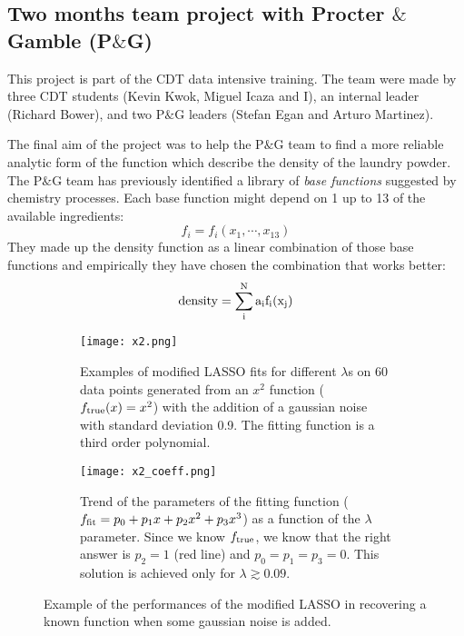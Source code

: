 \documentclass[11pt]{article}
\newcommand{\peg}{P$\&$G }
\begin{document}
\subsection{Two months team project with Procter $\&$ Gamble (P$\&$G)}
\label{sub:peg}

This project is part of the CDT data intensive training. The team were made by three CDT students (Kevin Kwok, Miguel Icaza and I), an internal leader (Richard Bower), and two \peg leaders (Stefan Egan and Arturo Martinez).

The final aim of the project was to help the P$\&$G team to find a more reliable analytic form of the function which describe the density of the laundry powder. The \peg team has previously identified a library of \textit{base functions} suggested by chemistry processes. Each base function might depend on 1 up to 13 of the available ingredients: 
\begin{equation}
\label{eq:fi}
f_i = f_i(x_1, \cdots, x_{13})
\end{equation}
They made up the density function as a linear combination of those base functions and empirically they have chosen the combination that works better: 
\begin{equation}
\label{eq:density}
\rm{density} = \sum_i^N a_i f_i(x_j)
\end{equation}


%
\begin{figure}
\centering
\begin{subfigure}{.48\textwidth}
   \centering
   \texttt{[image: x2.png]}
   \caption{Examples of modified LASSO fits for different $\lambda$s on 60 data points generated from an $x^2$ function ($f_{\rm{true}}(x)=x^2$) with the addition of a gaussian noise with standard deviation 0.9. The fitting function is a third order polynomial.}
   \label{fig:x2}
\end{subfigure}\hfill%
\begin{subfigure}{.48\textwidth}
   \centering
   \texttt{[image: x2\_coeff.png]}
   \caption{Trend of the parameters of the fitting function ($f_{\rm{fit}}=p_0 + p_1 x + p_2 x^2 + p_3 x^3$) as a function of the $\lambda$ parameter. Since we know $f_{\rm{true}}$, we know that the right answer is $p_2=1$ (red line) and $p_0=p_1=p_3 =0$. This solution is achieved only for $\lambda \gtrsim 0.09$.}
   \label{fig:x2_coeff}
\end{subfigure}
\caption{Example of the performances of the modified LASSO in recovering a known function when some gaussian noise is added.}
\label{fig:LASSO}
\end{figure}
%
\end{document}
